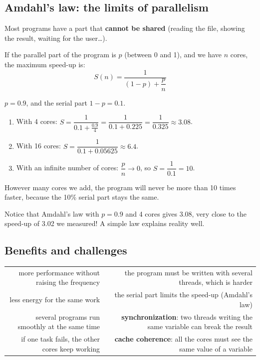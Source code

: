 \subsection{Amdahl's law: the limits of parallelism}
Most programs have a part that \textbf{cannot be shared} (reading the file, showing the result, waiting for the user\dots).

\begin{tarif}
    If the parallel part of the program is $p$ (between 0 and 1), and we have $n$ cores, the maximum speed-up is:
    \[ S(n) = \frac{1}{(1 - p) + \dfrac{p}{n}} \]
\end{tarif}

\begin{khatwa}
    $p = 0.9$, and the serial part $1 - p = 0.1$.
    \begin{enumerate}
        \item With 4 cores: $S = \dfrac{1}{0.1 + \frac{0.9}{4}} = \dfrac{1}{0.1 + 0.225} = \dfrac{1}{0.325} \approx 3.08$.
        \item With 16 cores: $S = \dfrac{1}{0.1 + 0.05625} \approx 6.4$.
        \item With an infinite number of cores: $\dfrac{p}{n} \rightarrow 0$, so $S = \dfrac{1}{0.1} = 10$.
    \end{enumerate}
    However many cores we add, the program will never be more than 10 times faster, because the 10\% serial part stays the same.
\end{khatwa}

\begin{hal}
    Notice that Amdahl's law with $p = 0.9$ and 4 cores gives 3.08, very close to the speed-up of 3.02 we measured!
    A simple law explains reality well.
\end{hal}

\subsection{Benefits and challenges}
\begin{center}
\small
\begin{tabularx}{\linewidth}{|R|R|}
    \hline
     &  \\ \hline
    more performance without raising the frequency & the program must be written with several threads, which is harder \\ \hline
    less energy for the same work & the serial part limits the speed-up (Amdahl's law) \\ \hline
    several programs run smoothly at the same time & \textbf{synchronization}: two threads writing the same variable can break the result \\ \hline
    if one task fails, the other cores keep working & \textbf{cache coherence}: all the cores must see the same value of a variable \\ \hline
\end{tabularx}
\end{center}

